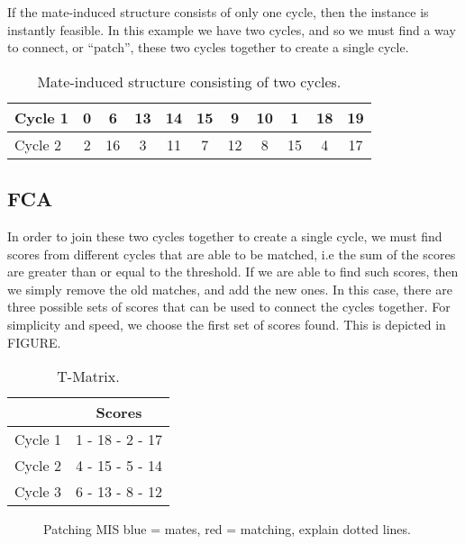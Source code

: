 \documentclass[a4paper, 11pt, twoside, onecolumn, openany]{article}
\begin{document}
If the mate-induced structure consists of only one cycle, then the instance is instantly feasible. In this example we have two cycles, and so we must find a way to connect, or ``patch'', these two cycles together to create a single cycle.


\begin{table}[htb]
	\centering
	\begin{tabular}{|l*{10}{|c}|}
		\hline
		Cycle 1 & 0 & 6 & 13 & 14 & 15 & 9 & 10 & 1 & 18 & 19 \\ \hline
		Cycle 2 & 2 & 16 & 3 & 11 & 7 & 12 & 8 & 15 & 4 & 17 \\
		\hline
	\end{tabular}
	\caption{Mate-induced structure consisting of two cycles.}	
	\label{table:mis}
\end{table}

\subsection{FCA}%
In order to join these two cycles together to create a single cycle, we must find scores from different cycles that are able to be matched, i.e the sum of the scores are greater than or equal to the threshold. If we are able to find such scores, then we simply remove the old matches, and add the new ones. In this case, there are three possible sets of scores that can be used to connect the cycles together. For simplicity and speed, we choose the first set of scores found. This is depicted in FIGURE.
 

\begin{table}[htb]
	\centering
	\begin{tabular}{c|c|}
		\cline{2-2}
		& Scores \\ \hline
		\multicolumn{1}{|c|}{Cycle 1} & 1 - 18 - 2 - 17 \\ \hline
		\multicolumn{1}{|c|}{Cycle 2} & 4 - 15 - 5 - 14 \\ \hline
		\multicolumn{1}{|c|}{Cycle 3} & 6 - 13 - 8 - 12 \\
		\hline
	\end{tabular}
	\caption{T-Matrix.}
	\label{table:tcycles}
\end{table}	


\begin{figure}[htb]
	\centering
	
	\caption{Patching MIS blue = mates, red = matching, explain dotted lines.}
	\label{fig:patch}	
\end{figure}
\end{document}
